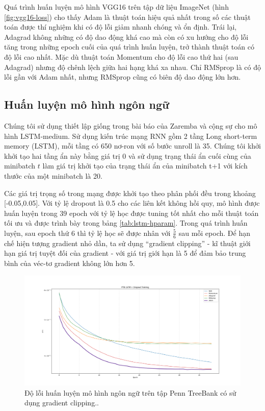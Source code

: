 Quá trình huấn luyện mô hình VGG16 trên tập dữ liệu ImageNet (hình \ref{fig:vgg16-loss}) cho thấy Adam là thuật toán hiệu quả nhất trong số các thuật toán được thí nghiệm khi có độ lỗi giảm nhanh chóng và ổn định. Trái lại, Adagrad không những có độ dao động khá cao mà còn có xu hướng cho độ lỗi tăng trong những epoch cuối của quá trình huấn luyện, trở thành thuật toán có độ lỗi cao nhất. Mặc dù thuật toán Momentum cho độ lỗi cao thứ hai (sau Adagrad) nhưng độ chênh lệch giữa hai hạng khá xa nhau. Chỉ RMSprop là có độ lỗi gần với Adam nhất, nhưng RMSprop cũng có biên độ dao động lớn hơn.

\subsection{Huấn luyện mô hình ngôn ngữ}
\label{exp:lstm}

Chúng tôi sử dụng thiết lập giống trong bài báo của Zaremba và cộng sự \cite{zaremba2014recurrent} cho mô hình LSTM-medium. Sử dụng kiến trúc mạng RNN gồm 2 tầng Long short-term memory (LSTM), mỗi tầng có 650 nơ-ron với số bước unroll là 35. Chúng tôi khởi khởi tạo hai tầng ẩn này bằng giá trị 0 và sử dụng trạng thái ẩn cuối cùng của minibatch $t$ làm giá trị khởi tạo của trạng thái ẩn của minibatch t+1 với kích thước của một minibatch là 20.

Các giá trị trọng số trong mạng được khởi tạo theo phân phối đều trong khoảng [-0.05,0.05]. Với tỷ lệ dropout là 0.5 cho các liên kết không hồi quy, mô hình được huấn luyện trong 39 epoch với tỷ lệ học được tuning tốt nhất cho mỗi thuật toán tối ưu và được trình bày trong bảng \ref{tab:lstm-hparam}. Trong quá trình huấn luyện, sau epoch thứ 6 thì tỷ lệ học sẽ được nhân với $\frac{5}{6}$ sau mỗi epoch. Để hạn chế hiện tượng gradient nhỏ dần, ta sử dụng ``gradient clipping'' - kĩ thuật giới hạn giá trị tuyệt đối của gradient - với giá trị giới hạn là 5 để đảm bảo trung bình của véc-tơ gradient không lớn hơn 5.

\begin{figure}[htp]
	\centering
	\includegraphics[width=140 mm]{images/ptb.png}
	\caption{Độ lỗi huấn luyện mô hình ngôn ngữ trên tập Penn TreeBank có sử dụng gradient clipping..}
	\label{fig:ptb}
\end{figure}

